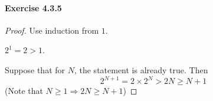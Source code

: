 \paragraph{Exercise 4.3.5} \label{exercise4.3.5}
\begin{proof}
Use induction from $1$.

$2^1 = 2 >1$.

Suppose that for $N$, the statement is already true. Then
\[
2^{N+1} = 2\times 2^N > 2N \geq N+1
\]
(Note that $N\geq 1 \Longrightarrow 2N \geq N+1$)
\end{proof}